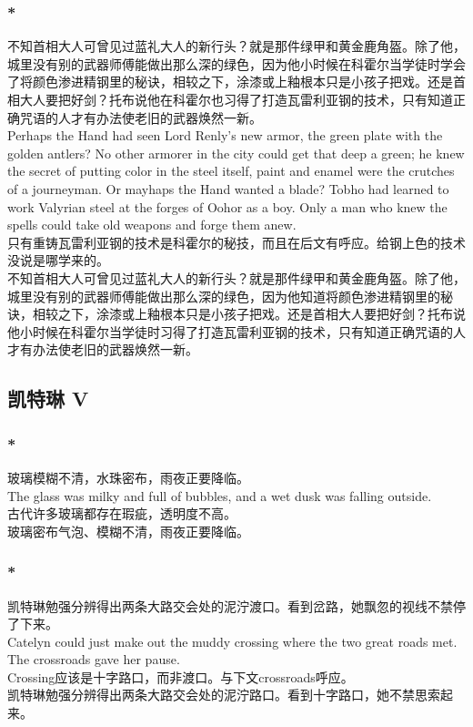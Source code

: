 \documentclass[12pt,a4paper]{article}
\newcommand{\h}[1]{{\color{red}#1}\\}
\newcommand{\la}[1]{{\color{blue}#1}\\}
\begin{document}
\subsubsection{\color{red}*}\la{
	不知首相大人可曾见过蓝礼大人的新行头？就是那件绿甲和黄金鹿角盔。除了他，城里没有别的武器师傅能做出那么深的绿色，因为他小时候在科霍尔当学徒时学会了将颜色渗进精钢里的秘诀，相较之下，涂漆或上釉根本只是小孩子把戏。还是首相大人要把好剑？托布说他在科霍尔也习得了打造瓦雷利亚钢的技术，只有知道正确咒语的人才有办法使老旧的武器焕然一新。\\
	Perhaps the Hand had seen Lord Renly's new armor, the green plate with the golden antlers? No other armorer in the city could get that deep a green; he knew the secret of putting color in the steel itself, paint and enamel were the crutches of a journeyman. Or mayhaps the Hand wanted a blade? Tobho had learned to work Valyrian steel at the forges of Oohor as a boy. Only a man who knew the spells could take old weapons and forge them anew.}\h{
	只有重铸瓦雷利亚钢的技术是科霍尔的秘技，而且在后文有呼应。给钢上色的技术没说是哪学来的。}
	不知首相大人可曾见过蓝礼大人的新行头？就是那件绿甲和黄金鹿角盔。除了他，城里没有别的武器师傅能做出那么深的绿色，因为他知道将颜色渗进精钢里的秘诀，相较之下，涂漆或上釉根本只是小孩子把戏。还是首相大人要把好剑？托布说他小时候在科霍尔当学徒时习得了打造瓦雷利亚钢的技术，只有知道正确咒语的人才有办法使老旧的武器焕然一新。

\subsection{凯特琳 V}
\subsubsection{\color{red}*}\label{1.28.5}\la{
	玻璃模糊不清，水珠密布，雨夜正要降临。\\
	The glass was milky and full of bubbles, and a wet dusk was falling outside. }\h{
	古代许多玻璃都存在瑕疵，透明度不高。}
	玻璃密布气泡、模糊不清，雨夜正要降临。
	
\subsubsection{\color{red}*}\la{
	凯特琳勉强分辨得出两条大路交会处的泥泞渡口。看到岔路，她飘忽的视线不禁停了下来。\\
	Catelyn could just make out the muddy crossing where the two great roads met. The crossroads gave her pause.}\h{
	Crossing应该是十字路口，而非渡口。与下文crossroads呼应。}
	凯特琳勉强分辨得出两条大路交会处的泥泞路口。看到十字路口，她不禁思索起来。
	
\end{document}
